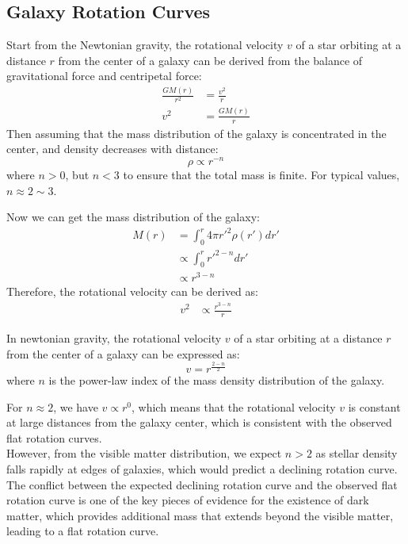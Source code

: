 \clearpage
\subsection{Galaxy Rotation Curves}
\begin{foundation}
    Start from the Newtonian gravity, the rotational velocity $v$ of a star orbiting at a distance $r$ from the center of a galaxy can be derived from the balance of gravitational force and centripetal force:
    \begin{align*}
        \frac{GM(r)}{r^2} &= \frac{v^2}{r} \\
        v^2 &= \frac{GM(r)}{r}
    \end{align*}
    Then assuming that the mass distribution of the galaxy is concentrated in the center, and density decreases with distance:
    \[
        \rho \propto r^{-n}
    \]
    where $n > 0$, but $n < 3$ to ensure that the total mass is finite. For typical values, $n \approx 2 \sim 3$.

    Now we can get the mass distribution of the galaxy:
    \begin{align*}
        M(r) &= \int_0^r 4\pi r'^2 \rho(r') dr' \\
        &\propto \int_0^r r'^{2-n} dr' \\
        &\propto r^{3-n}
    \end{align*}
    Therefore, the rotational velocity can be derived as:
    \begin{align*}
        v^2 &\propto \frac{r^{3-n}}{r}
    \end{align*}
\end{foundation}

\bigskip \noindent
\begin{theory}
    In newtonian gravity, the rotational velocity $v$ of a star orbiting at a distance $r$ from the center of a galaxy can be expressed as:
    \[
        v = r^{\frac{2-n}{2}}
    \]
    where $n$ is the power-law index of the mass density distribution of the galaxy.
\end{theory}

\clearpage
\begin{intuition}
    For $n \approx 2$, we have $v \propto r^0$, which means that the rotational velocity $v$ is constant at large distances from the galaxy center, which is consistent with the observed flat rotation curves. \\
    
    However, from the visible matter distribution, we expect $n > 2$ as stellar density falls rapidly at edges of galaxies, which would predict a declining rotation curve. The conflict between the expected declining rotation curve and the observed flat rotation curve is one of the key pieces of evidence for the existence of dark matter, which provides additional mass that extends beyond the visible matter, leading to a flat rotation curve.
\end{intuition}

